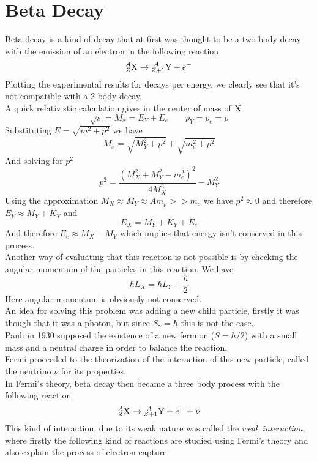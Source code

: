 \documentclass[../qm.tex]{subfiles}
\begin{document}
\section{Beta Decay}
Beta decay is a kind of decay that at first was thought to be a two-body decay with the emission of an electron in the following reaction
\begin{equation*}
	\nuc{X}{A}{Z}\to\nuc{Y}{\ A}{Z+1}+e^-
\end{equation*}
Plotting the experimental results for decays per energy, we clearly see that it's not compatible with a 2-body decay.\\
A quick relativistic calculation gives in the center of mass of ${}_{}^{}{\mathrm{X}}_{}$
\begin{equation*}
	\sqrt{s}=M_x=E_Y+E_e\qquad p_Y=p_e=p
\end{equation*}
Substituting $E=\sqrt{m^2+p^2}$ we have
\begin{equation*}
	M_x=\sqrt{M_Y^2+p^2}+\sqrt{m_e^2+p^2}
\end{equation*}
And solving for $p^2$
\begin{equation*}
	p^2=\frac{\left( M_X^2+M_Y^2-m_e^2 \right)^2}{4M_X^2}-M_Y^2
\end{equation*}
Using the approximation $M_X\approx M_Y\approx Am_p>>m_e$ we have $p^2\approx0$ and therefore $E_Y\approx M_Y+K_Y$ and
\begin{equation*}
	E_X=M_Y+K_Y+E_e
\end{equation*}
And therefore $E_e\approx M_X-M_Y$ which implies that energy isn't conserved in this process.\\
Another way of evaluating that this reaction is not possible is by checking the angular momentum of the particles in this reaction. We have
\begin{equation*}
	\hbar L_X=\hbar L_Y+\frac{\hbar}{2}
\end{equation*}
Here angular momentum is obviously not conserved.\\
An idea for solving this problem was adding a new child particle, firstly it was though that it was a photon, but since $S_\gamma=\hbar$ this is not the case.\\
Pauli in 1930 supposed the existence of a new fermion ($S=\hbar/2$) with a small mass and a neutral charge in order to balance the reaction.\\
Fermi proceeded to the theorization of the interaction of this new particle, called the neutrino $\nu$ for its properties.\\
In Fermi's theory, beta decay then became a three body process with the following reaction
\begin{equation}
	\nuc{X}{A}{Z}\to\nuc{Y}{\ A}{Z+1}+e^-+\cc{\nu}
	\label{eq:neutrinoprod}
\end{equation}
This kind of interaction, due to its weak nature was called the \emph{weak interaction}, where firstly the following kind of reactions are studied using Fermi's theory and also explain the process of electron capture.\\
\end{document}
